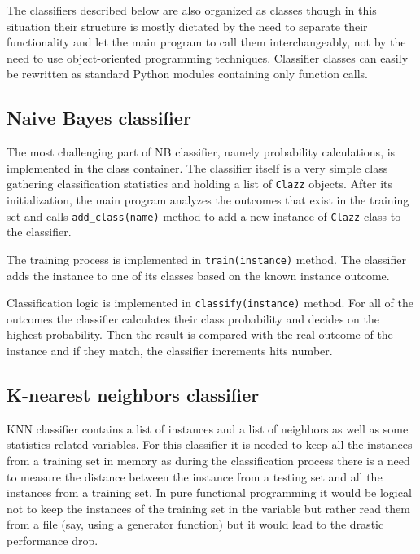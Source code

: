 \documentclass{llncs}
\begin{document}
The classifiers described below are also organized as classes though in this situation their structure is mostly dictated by the need to separate their functionality and let the main program to call them interchangeably, not by the need to use object-oriented programming techniques. Classifier classes can easily be rewritten as standard Python modules containing only function calls.

\subsection{Naive Bayes classifier}

The most challenging part of NB classifier, namely probability calculations, is implemented in the class container. The classifier itself is a very simple class gathering classification statistics and holding a list of \lstinline{Clazz} objects. After its initialization, the main program analyzes the outcomes that exist in the training set and calls \lstinline{add_class(name)} method to add a new instance of \lstinline{Clazz} class to the classifier.

The training process is implemented in \lstinline{train(instance)} method. The classifier adds the instance to one of its classes based on the known instance outcome.

Classification logic is implemented in \lstinline{classify(instance)} method. For all of the outcomes the classifier calculates their class probability and decides on the highest probability. Then the result is compared with the real outcome of the instance and if they match, the classifier increments hits number.

\subsection{K-nearest neighbors classifier}

KNN classifier contains a list of instances and a list of neighbors as well as some statistics-related variables. For this classifier it is needed to keep all the instances from a training set in memory as during the classification process there is a need to measure the distance between the instance from a testing set and all the instances from a training set. In pure functional programming it would be logical not to keep the instances of the training set in the variable but rather read them from a file (say, using a generator function) but it would lead to the drastic performance drop.
\end{document}
